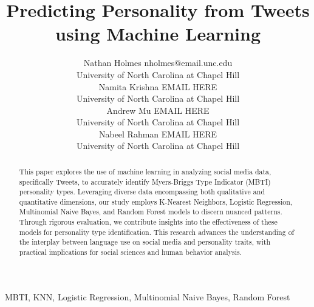 \documentclass[twoside,11pt]{article}
\begin{document}
\title{Predicting Personality from Tweets using Machine Learning}

\author{\name Nathan Holmes \email nholmes@email.unc.edu \\
       \addr University of North Carolina at Chapel Hill\\
       \AND
       \name Namita Krishna \email EMAIL HERE \\
       \addr University of North Carolina at Chapel Hill\\
       \AND
       \name Andrew Mu \email EMAIL HERE \\
       \addr University of North Carolina at Chapel Hill\\
       \AND
       \name Nabeel Rahman \email EMAIL HERE \\
       \addr University of North Carolina at Chapel Hill\\
       }

\maketitle

\begin{abstract}%
This paper explores the use of machine learning in analyzing social media data, specifically Tweets, to accurately identify Myers-Briggs Type Indicator (MBTI) personality types. Leveraging diverse data encompassing both qualitative and quantitative dimensions, our study employs K-Nearest Neighbors, Logistic Regression, Multinomial Naive Bayes, and Random Forest models to discern nuanced patterns. Through rigorous evaluation, we contribute insights into the effectiveness of these models for personality type identification. This research advances the understanding of the interplay between language use on social media and personality traits, with practical implications for social sciences and human behavior analysis.
\end{abstract}

\begin{keywords}
  MBTI, KNN, Logistic Regression, Multinomial Naive Bayes, Random Forest
\end{keywords}
\end{document}
